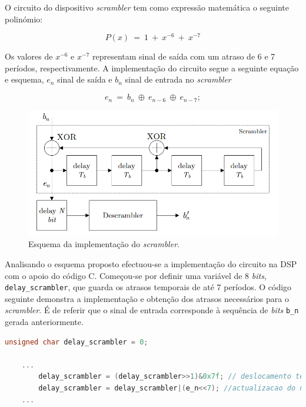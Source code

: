 \documentclass[11pt]{article}
\numberwithin{equation}{section}
\begin{document}
O circuito do dispositivo \textit{scrambler} tem como expressão matemática o seguinte polinómio:

\vspace{-3mm}
\begin{equation}
	P(x)~= ~1~+~x^{-6}~+~x^{-7}
\end{equation}  

\vspace{1mm}
Os valores de $x^{-6}$ e $x^{-7}$ representam sinal de saída com um atraso de 6 e 7 períodos, respectivamente. A implementação do circuito segue a seguinte equação e esquema, $e_n$ sinal de saída e $b_n$ sinal de entrada no  \textit{scrambler}

\vspace{-3mm}
\begin{equation}
	e_n~= ~b_n~\oplus~e_{n-6}~\oplus~e_{n-7};
\end{equation}  

\begin{figure}[H]
	\centering
	\includegraphics[keepaspectratio=true, scale=0.50]{teoricas/scrambler}
	\caption{Esquema da implementação do \textit{scrambler}.}
	\vspace{-0.8em}
\end{figure}

Analisando o esquema proposto efectuou-se a implementação do circuito na DSP com o apoio do código C.
Começou-se por definir uma variável de 8 \textit{bits}, \texttt{delay\_scrambler}, que guarda os atrasos temporais de até 7 períodos. O código seguinte demonstra a implementação e obtenção dos atrasos necessários para o \textit{scrambler}. É de referir que o sinal de entrada corresponde à sequência de \textit{bits} \texttt{b\_n} gerada anteriormente.

\begin{lstlisting}[language=C]
	unsigned char delay_scrambler = 0;
	
	...
		delay_scrambler = (delay_scrambler>>1)&0x7f; // deslocamento temporal
		delay_scrambler = delay_scrambler|(e_n<<7); //actualizacao do novo valor de e_n no vector	
	...
\end{lstlisting}
\end{document}

